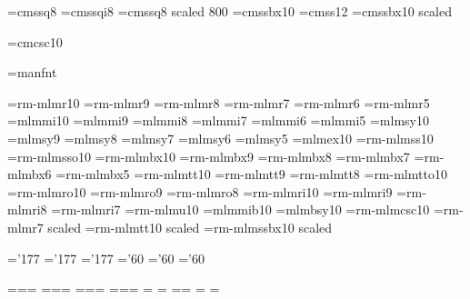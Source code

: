 \font\eightss=cmssq8
\font\eightssi=cmssqi8
\font\sixss=cmssq8 scaled 800
\font\tenssbx=cmssbx10
\font\twelvess=cmss12
\font\titlefont=cmssbx10 scaled

\font\tencsc=cmcsc10

\font\manfnt=manfnt %


\font\tenrm=rm-mlmr10 %
\font\preloaded=rm-mlmr9
\font\preloaded=rm-mlmr8
\font\sevenrm=rm-mlmr7
\font\preloaded=rm-mlmr6
\font\fiverm=rm-mlmr5
\font\teni=mlmmi10 %
\font\preloaded=mlmmi9
\font\preloaded=mlmmi8
\font\seveni=mlmmi7
\font\preloaded=mlmmi6
\font\fivei=mlmmi5
\font\tensy=mlmsy10 %
\font\preloaded=mlmsy9
\font\preloaded=mlmsy8
\font\sevensy=mlmsy7
\font\preloaded=mlmsy6
\font\fivesy=mlmsy5
\font\tenex=mlmex10 %
\font\preloaded=rm-mlmss10 %
\font\preloaded=rm-mlmsso10 %
\font\tenbf=rm-mlmbx10 %
\font\preloaded=rm-mlmbx9
\font\preloaded=rm-mlmbx8
\font\sevenbf=rm-mlmbx7
\font\preloaded=rm-mlmbx6
\font\fivebf=rm-mlmbx5
\font\tentt=rm-mlmtt10 %
\font\preloaded=rm-mlmtt9
\font\preloaded=rm-mlmtt8
\font\preloaded=rm-mlmtto10 %
\font\tensl=rm-mlmro10 %
\font\preloaded=rm-mlmro9
\font\preloaded=rm-mlmro8
\font\tenit=rm-mlmri10 %
\font\preloaded=rm-mlmri9
\font\preloaded=rm-mlmri8
\font\preloaded=rm-mlmri7
\font\preloaded=rm-mlmu10 %
\font\preloaded=mlmmib10 %
\font\preloaded=mlmbsy10 %
\font\preloaded=rm-mlmcsc10 %
\font\preloaded=rm-mlmr7 scaled  %
\font\preloaded=rm-mlmtt10 scaled 
\font\preloaded=rm-mlmssbx10 scaled 

\let\preloaded=\undefined %

\skewchar\teni='177 \skewchar\seveni='177 \skewchar\fivei='177
\skewchar\tensy='60 \skewchar\sevensy='60 \skewchar\fivesy='60

=\tenrm {}=\sevenrm {}=\fiverm
\def\rm{\fam\z@\tenrm}
=\teni {}=\seveni {}=\fivei
\def\mit{\fam\@ne} \def\oldstyle{\fam\@ne\teni}
=\tensy {}=\sevensy {}=\fivesy
\def\cal{\fam\tw@}
=\tenex {}=\tenex {}=\tenex
\newfam\itfam \def\it{\fam\itfam\tenit} %
\textfont\itfam=\tenit
\newfam\slfam \def\sl{\fam\slfam\tensl} %
\textfont\slfam=\tensl
\newfam\bffam \def\bf{\fam\bffam\tenbf} %
\textfont\bffam=\tenbf \scriptfont\bffam=\sevenbf
\scriptscriptfont\bffam=\fivebf
\newfam\ttfam \def\tt{\fam\ttfam\tentt} %
\textfont\ttfam=\tentt


